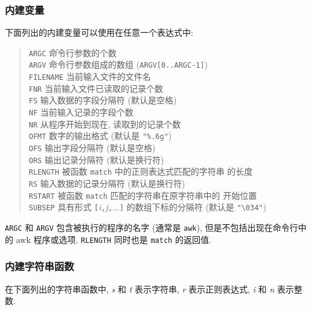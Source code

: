 \subsubsection{内建变量}
下面列出的内建变量可以使用在任意一个表达式中:
\begin{quote}
    \begin{tabbing}
        \texttt{ARGC}\hspace{6em}   \= 命令行参数的个数 \\
        \texttt{ARGV}   \> 命令行参数组成的数组 (\texttt{ARGV[0..ARGC-1]})\\
        \texttt{FILENAME}\> 当前输入文件的文件名 \\
        \texttt{FNR}    \> 当前输入文件已读取的记录个数 \\
        \texttt{FS}     \> 输入数据的字段分隔符 (默认是空格) \\
        \texttt{NF}     \> 当前输入记录的字段个数 \\
        \texttt{NR}     \> 从程序开始到现在, 读取到的记录个数 \\
        \texttt{OFMT}   \> 数字的输出格式 (默认是 \verb'"%.6g"') \\
        \texttt{OFS}    \> 输出字段分隔符 (默认是空格)\\
        \texttt{ORS}    \> 输出记录分隔符 (默认是换行符) \\
        \texttt{RLENGTH}\> 被函数 \texttt{match} 中的正则表达式匹配的字符串
        的长度 \\
        \texttt{RS}     \> 输入数据的记录分隔符 (默认是换行符) \\
        \texttt{RSTART} \> 被函数 \texttt{match} 匹配的字符串在原字符串中的
        开始位置 \\
        \texttt{SUBSEP} \> 具有形式
        \texttt{[}\textit{i}\texttt{,}\textit{j}\texttt{,}...\texttt{]}
        的数组下标的分隔符 (默认是 \verb'"\034"') \\
    \end{tabbing}
\end{quote}
\texttt{ARGC} 和 \texttt{ARGV} 包含被执行的程序的名字 (通常是
\texttt{awk}), 但是不包括出现在命令行中的 awk 程序或选项.
\texttt{RLENGTH} 同时也是 \texttt{match} 的返回值.

\subsubsection{内建字符串函数}
在下面列出的字符串函数中, \textit{s} 和 \textit{t} 表示字符串, \textit{r}
表示正则表达式, \textit{i} 和 \textit{n} 表示整数.

